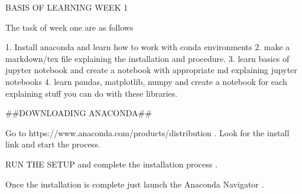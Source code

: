 BASIS OF LEARNING
WEEK 1

The task of week one are as follows 

1. Install anaconda and learn how to work with conda environments
2. make a markdown/tex file explaining the installation and procedure.
3. learn basics of jupyter notebook and create a notebook with appropriate md explaining jupyter notebooks
4. learn pandas, matplotlib, numpy and create a notebook for each explaining stuff you can do with these libraries. 

##DOWNLOADING ANACONDA##

Go to https://www.anaconda.com/products/distribution .
Look for the install link and start the process. 

RUN THE SETUP and complete the installation process . 


Once the installation is complete just launch the Anaconda Navigator .
